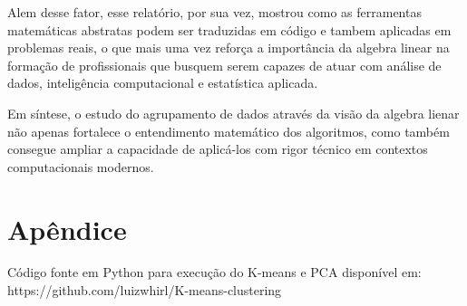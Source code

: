 \documentclass[a4paper,12pt]{article}
\begin{document}
Alem desse fator, esse relatório, por sua vez, mostrou como as ferramentas matemáticas abstratas podem ser traduzidas em código e tambem aplicadas em problemas reais, o que mais uma vez reforça a importância da algebra linear na formação de profissionais que busquem serem capazes de atuar com análise de dados, inteligência computacional e estatística aplicada.

Em síntese, o estudo do agrupamento de dados através da visão da algebra lienar não apenas fortalece o entendimento matemático dos algoritmos, como também consegue ampliar a capacidade de aplicá-los com rigor técnico em contextos computacionais modernos.

\newpage
\renewcommand{\refname}{\section{Referências}
\addcontentsline{toc}{section}{Referências}}



    \section{Apêndice}
Código fonte em Python para execução do K-means e PCA disponível em:
https://github.com/luizwhirl/K-means-clustering
\end{document}

